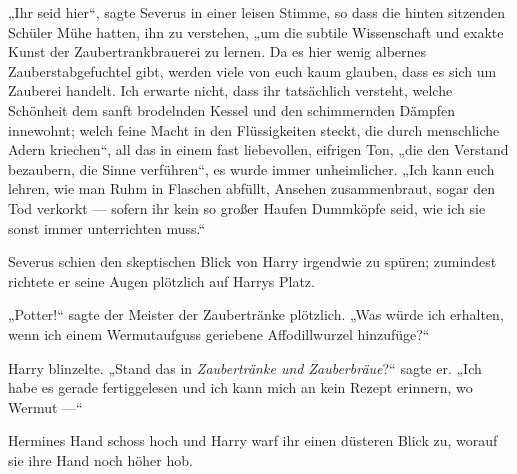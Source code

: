 „Ihr seid hier“, sagte Severus in einer leisen Stimme, so dass die hinten sitzenden Schüler Mühe hatten, ihn zu verstehen, „um die subtile Wissenschaft und exakte Kunst der Zaubertrankbrauerei zu lernen. Da es hier wenig albernes Zauberstabgefuchtel gibt, werden viele von euch kaum glauben, dass es sich um Zauberei handelt. Ich erwarte nicht, dass ihr tatsächlich versteht, welche Schönheit dem sanft brodelnden Kessel und den schimmernden Dämpfen innewohnt; welch feine Macht in den Flüssigkeiten steckt, die durch menschliche Adern kriechen“, all das in einem fast liebevollen, eifrigen Ton, „die den Verstand bezaubern, die Sinne verführen“, es wurde immer unheimlicher.
„Ich kann euch lehren, wie man Ruhm in Flaschen abfüllt, Ansehen zusammenbraut, sogar den Tod verkorkt — sofern ihr kein so großer Haufen Dummköpfe seid, wie ich sie sonst immer unterrichten muss.“

Severus schien den skeptischen Blick von Harry irgendwie zu spüren; zumindest richtete er seine Augen plötzlich auf Harrys Platz.

„Potter!“ sagte der Meister der Zaubertränke plötzlich.
„Was würde ich erhalten, wenn ich einem Wermutaufguss geriebene Affodillwurzel hinzufüge?“

Harry blinzelte.
„Stand das in \emph{Zaubertränke und Zauberbräue}?“ sagte er.
„Ich habe es gerade fertiggelesen und ich kann mich an kein Rezept erinnern, wo Wermut —“

Hermines Hand schoss hoch und Harry warf ihr einen düsteren Blick zu, worauf sie ihre Hand noch höher hob.

